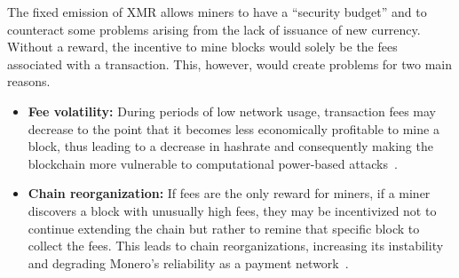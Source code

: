 \documentclass[conference]{IEEEtran}
\begin{document}
The fixed emission of XMR allows miners to have a ``security budget'' and to counteract some problems arising from the lack of issuance of new currency. Without a reward, the incentive to mine blocks would solely be the fees associated with a transaction. This, however, would create problems for two main reasons.
\begin{itemize}
\item \textbf{Fee volatility:} During periods of low network usage, transaction fees may decrease to the point that it becomes less economically profitable to mine a block, thus leading to a decrease in hashrate and consequently making the blockchain more vulnerable to computational power-based attacks~\cite{attack_51}.
\item \textbf{Chain reorganization:} If fees are the only reward for miners, if a miner discovers a block with unusually high fees, they may be incentivized not to continue extending the chain but rather to remine that specific block to collect the fees. This leads to chain reorganizations, increasing its instability and degrading Monero's reliability as a payment network~\cite{fee_sniping}.
\end{itemize}
\end{document}

